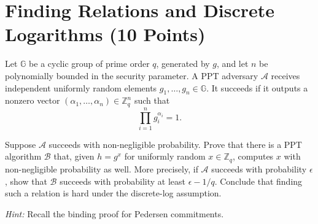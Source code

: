 \documentclass[11pt]{article}
\begin{document}
\section{Finding Relations and Discrete Logarithms (10 Points)}
Let $\mathbb G$ be a cyclic group of prime order $q$, generated by $g$, and let $n$ be polynomially bounded in the security parameter. A PPT adversary $\mathcal A$ receives independent uniformly random elements $g_1,\ldots,g_n\in\mathbb G$. It succeeds if it outputs a nonzero vector $(\alpha_1,\ldots,\alpha_n)\in\mathbb Z_q^n$ such that
\[\prod_{i=1}^n g_i^{\alpha_i}=1.\]

Suppose $\mathcal A$ succeeds with non-negligible probability. Prove that there is a PPT algorithm $\mathcal B$ that, given $h=g^x$ for uniformly random $x\in\mathbb Z_q$, computes $x$ with non-negligible probability as well. More precisely, if $\mathcal A$ succeeds with probability $\epsilon$, show that $\mathcal B$ succeeds with probability at least $\epsilon-1/q$. Conclude that finding such a relation is hard under the discrete-log assumption.

\textit{Hint:} Recall the binding proof for Pedersen commitments.
\end{document}
